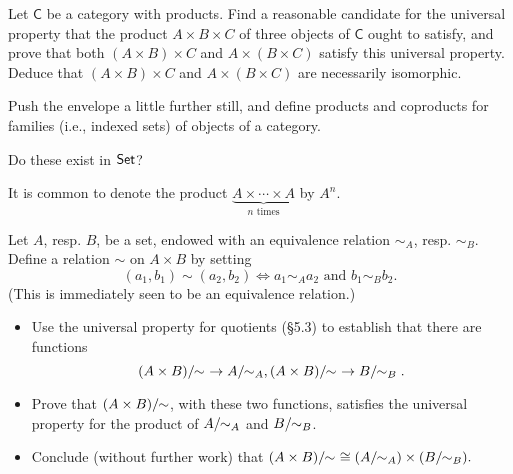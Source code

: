\begin{solution}
\end{solution}


\begin{problem}[5.9]
  Let $\mathsf{C}$ be a category with products. Find a reasonable candidate for the
  universal property that the product $A\times B\times C$ of three objects of $\mathsf{C}$
  ought to satisfy, and prove that both $(A\times B)\times C$ and $A\times
  (B\times C)$ satisfy this universal property. Deduce that $(A\times B)\times C$
  and $A\times (B\times C)$ are necessarily isomorphic.
\end{problem}

\begin{problem}[5.10]
  Push the envelope a little further still, and define products and coproducts for families (i.e., indexed sets) of objects of a category.
 
  Do these exist in $\mathsf{Set}$?
 
  It is common to denote the product $\underbrace{A\times\cdots\times A}_{n \text{ times}}$ by $A^n$.
\end{problem}

\begin{problem}[5.11]
  Let $A$, resp. $B$, be a set, endowed with an equivalence relation $\sim_A$,
  resp. $\sim_B$.
  Define a relation $\sim$ on $A\times B$ by setting
  \[ (a_1, b_1) \sim (a_2, b_2) \iff a_1 \sim_A a_2 \text{ and } b_1 \sim_B b_2. \]
  (This is immediately seen to be an equivalence relation.)
  \begin{itemize}
    \item Use the universal property for quotients (\S5.3) to establish that there are
    functions
    \[ \quot{(A\times B)}{\sim} \to \quotntws{A}{\sim_A},
    \quot{(A\times B)}{\sim} \to \quotntws{B}{\sim_B}. \]
    \item Prove that $(A\times B)/\!\!\sim$, with these two functions,
    satisfies the universal property for the product of $A/\!\!\sim_A$ and
    $B/\!\!\sim_B$.
    \item Conclude (without further work) that $(A\times
      B)/\!\!\sim\,\,\cong(A/\!\!\sim_A)\times(B/\!\!\sim_B).$
  \end{itemize}
\end{problem}

